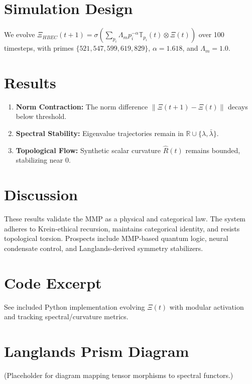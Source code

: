 \documentclass{article}
\begin{document}
\section{Simulation Design}
We evolve $\Xi_{HBEC}(t+1) = \sigma\left(\sum_{p_i} \Lambda_m p_i^{-\alpha} \mathbb{T}_{p_i}(t) \otimes \Xi(t)\right)$ over 100 timesteps, with primes $\{521, 547, 599, 619, 829\}$, $\alpha = 1.618$, and $\Lambda_m = 1.0$.

\section{Results}
\begin{enumerate}
\item \textbf{Norm Contraction:} The norm difference $\|\Xi(t+1) - \Xi(t)\|$ decays below threshold.
\item \textbf{Spectral Stability:} Eigenvalue trajectories remain in $\mathbb{R} \cup \{\lambda, \bar{\lambda}\}$.
\item \textbf{Topological Flow:} Synthetic scalar curvature $\hat{R}(t)$ remains bounded, stabilizing near 0.
\end{enumerate}

\section{Discussion}
These results validate the MMP as a physical and categorical law. The system adheres to Krein-ethical recursion, maintains categorical identity, and resists topological torsion. Prospects include MMP-based quantum logic, neural condensate control, and Langlands-derived symmetry stabilizers.

\appendix
\section{Code Excerpt}
See included Python implementation evolving $\Xi(t)$ with modular activation and tracking spectral/curvature metrics.

\section{Langlands Prism Diagram}
(Placeholder for diagram mapping tensor morphisms to spectral functors.)
\nocite{*}


\end{document}

